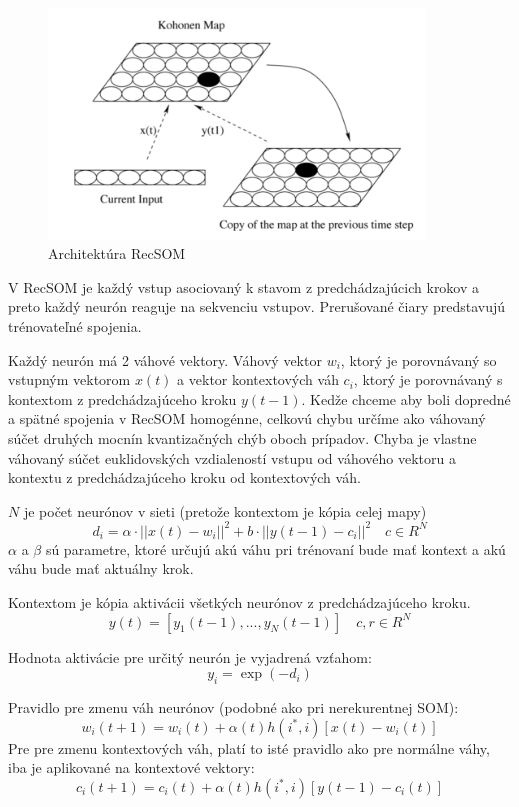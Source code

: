 \begin{figure}[H]
	\centering
	\includegraphics[width=10cm]{assets/rec_som}
	\caption{Architektúra RecSOM}
\end{figure}

V RecSOM je každý vstup asociovaný k stavom z predchádzajúcich krokov a preto každý 
neurón reaguje na sekvenciu vstupov.
Prerušované čiary predstavujú trénovateľné spojenia.

Každý neurón má 2 váhové vektory. Váhový vektor $w_i$, ktorý je porovnávaný so
vstupným vektorom $x(t)$ a vektor kontextových váh $c_i$, ktorý je porovnávaný s kontextom z predchádzajúceho
kroku $y(t-1)$. Kedže chceme aby boli dopredné a spätné spojenia v RecSOM homogénne, 
celkovú chybu určíme ako váhovaný súčet druhých mocnín kvantizačných chýb oboch prípadov. Chyba je vlastne váhovaný súčet euklidovských vzdialeností
vstupu od váhového vektoru a kontextu z predchádzajúceho kroku od kontextových váh. 

$N$ je počet neurónov v sieti (pretože kontextom je kópia celej mapy)
\begin{equation}
	d_i = \alpha \cdot ||x(t) - w_i||^{2} + b \cdot ||y(t-1) - c_i||^{2} \quad c \in R^{N}
\end{equation}
$\alpha$ a $\beta$ sú parametre, ktoré určujú akú váhu pri trénovaní bude mať kontext a akú váhu bude mať
aktuálny krok.

Kontextom je kópia aktivácii všetkých neurónov z predchádzajúceho kroku.
\begin{equation}
	y(t) = [y_1(t-1), ..., y_{N}(t-1)]  \quad c, r \in R^{N}
\end{equation}

Hodnota aktivácie pre určitý neurón je vyjadrená vzťahom:
\begin{equation}
	y_i = \exp(-d_i)
\end{equation}

Pravidlo pre zmenu váh neurónov (podobné ako pri nerekurentnej SOM):
\begin{equation}
	w_i(t + 1) = w_i(t) + \alpha(t)h(i^*, i)[x(t) - w_i(t)]
\end{equation}
Pre pre zmenu kontextových váh, platí to isté pravidlo ako pre normálne váhy, iba je aplikované 
na kontextové vektory:
\begin{equation}
	c_i(t + 1) = c_i(t) + \alpha(t)h(i^*, i)[y(t - 1) - c_i(t)]
\end{equation}

